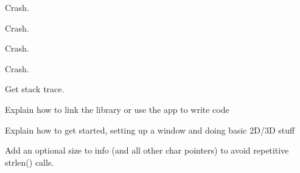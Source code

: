 
\begin{DoxyRefList}
\item[Global \mbox{\hyperlink{_errors_8c_a7d282f7b1946c1fc11fa7b75308da784}{n\+Error\+Throw}} (const int32\+\_\+t error, const char $\ast$info)]\label{todo__todo000001}%
%
Crash. 

\label{todo__todo000002}%
%
Crash. 

\label{todo__todo000003}%
%
Crash.  
\item[Global \mbox{\hyperlink{_errors_8c_ae4125b7ad9b7d399521546473d3ccfff}{n\+Error\+To\+String}} (char $\ast$dst, int32\+\_\+t $\ast$size, const int32\+\_\+t error, const char $\ast$info)]\label{todo__todo000004}%
%
Crash.  
\item[Global \mbox{\hyperlink{_errors_8c_a51c5b711f13bd8a6090936b7b2c21ecb}{n\+Error\+Get\+Stacktrace}} (char $\ast$dst, int32\+\_\+t $\ast$size, int32\+\_\+t $\ast$levels)]\label{todo__todo000005}%
%
Get stack trace.  
\item[page \mbox{\hyperlink{index}{Nimble Game Engine Library}} ]\label{todo__todo000006}%
%
Explain how to link the library or use the app to write code 

\label{todo__todo000007}%
%
Explain how to get started, setting up a window and doing basic 2D/3D stuff 
\item[Global \mbox{\hyperlink{_errors_8c_ae4125b7ad9b7d399521546473d3ccfff}{n\+Error\+To\+String}} (char $\ast$dst, int32\+\_\+t $\ast$size, const int32\+\_\+t error, const char $\ast$info)]\label{todo__todo000008}%
%
Add an optional size to {\ttfamily info} (and all other char pointers) to avoid repetitive strlen() calls. 
\end{DoxyRefList}